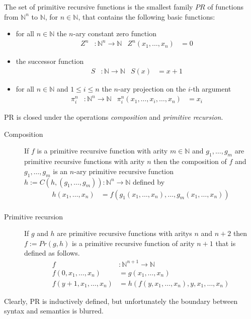 \documentclass{jfp}
\newcommand{\xn}{x_1,\dots,x_n }
\begin{document}
The set of primitive recursive functions is the smallest family $PR$ of functions
from ${ℕ}^n$  to ${ℕ}$, for $n\in {ℕ}$, that contains the following
basic functions:
\begin{itemize}
\item for all $n\in {ℕ}$ the $n$-ary constant zero function
  \begin{align*}
	Z^n  &\colon \mathbb{N}^n \rightarrow \mathbb{N}  &
	Z^n    (\xn) &= 0  
  \end{align*}
\item the successor function
  \begin{align*}
	S &\colon \mathbb{N} \rightarrow \mathbb{N} &
	S  (x)  &=  x + 1
  \end{align*}
\item for all $n\in {ℕ}$ and $1\le i\le n$ the $n$-ary projection on
  the $i$-th argument
\begin{align*}
	\pi^{n}_{i} &\colon \mathbb{N}^n \rightarrow \mathbb{N} &
	\pi^{n}_{i}  (x_1,\dots,x_i,\dots,x_n)  &= x_i
\end{align*}
\end{itemize}
PR is closed under the operations \emph{composition} and \emph{primitive recursion}.
\begin{description}
\item[Composition] 
If $f$ is a primitive recursive function with arity $m \in {ℕ}$ and $g_1,
\dots, g_m$ are primitive recursive functions with arity $n$ then the
composition of $f$ and $g_1, \dots, g_m$ is an $n$-ary primitive recursive function
$h := C (h,(g_1,\dots, g_m)) \colon \mathbb{N}^n \rightarrow \mathbb{N} $ defined by
\begin{align*}
	h  (\xn)  &= f (g_1(\xn),\dots,g_m(\xn)) \\
\end{align*}

\item[Primitive recursion] 
If $g$ and $h$ are primitive recursive functions with aritys $n$ and
$n+2$ then $f := Pr (g,h)$ is a primitive recursive function of arity $n+1$ that is defined as follows.
\begin{align*}
	f&\colon \mathbb{N}^{n+1} \rightarrow \mathbb{N} \\
	f  (0,\xn)  &= g (\xn) \\
	f  (y + 1,\xn) &= h(  f(y,\xn),y,\xn)
\end{align*}

\end{description}

Clearly, PR is inductively defined, but unfortunately the boundary
between syntax and semantics is blurred.
\end{document}
